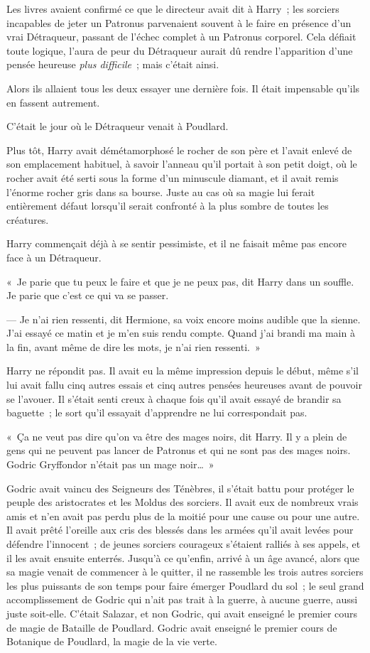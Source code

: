Les livres avaient confirmé ce que le directeur avait dit à Harry~; les sorciers incapables de jeter un Patronus parvenaient souvent à le faire en présence d'un vrai Détraqueur, passant de l'échec complet à un Patronus corporel. Cela défiait toute logique, l'aura de peur du Détraqueur aurait dû rendre l'apparition d'une pensée heureuse \emph{plus difficile}~; mais c'était ainsi.

Alors ils allaient tous les deux essayer une dernière fois. Il était impensable qu'ils en fassent autrement.

C'était le jour où le Détraqueur venait à Poudlard.

Plus tôt, Harry avait démétamorphosé le rocher de son père et l'avait enlevé de son emplacement habituel, à savoir l'anneau qu'il portait à son petit doigt, où le rocher avait été serti sous la forme d'un minuscule diamant, et il avait remis l'énorme rocher gris dans sa bourse. Juste au cas où sa magie lui ferait entièrement défaut lorsqu'il serait confronté à la plus sombre de toutes les créatures.

Harry commençait déjà à se sentir pessimiste, et il ne faisait même pas encore face à un Détraqueur.

«~Je parie que tu peux le faire et que je ne peux pas, dit Harry dans un souffle. Je parie que c'est ce qui va se passer.

--- Je n'ai rien ressenti, dit Hermione, sa voix encore moins audible que la sienne. J'ai essayé ce matin et je m'en suis rendu compte. Quand j'ai brandi ma main à la fin, avant même de dire les mots, je n'ai rien ressenti.~»

Harry ne répondit pas. Il avait eu la même impression depuis le début, même s'il lui avait fallu cinq autres essais et cinq autres pensées heureuses avant de pouvoir se l'avouer. Il s'était senti creux à chaque fois qu'il avait essayé de brandir sa baguette~; le sort qu'il essayait d'apprendre ne lui correspondait pas.

«~Ça ne veut pas dire qu'on va être des mages noirs, dit Harry. Il y a plein de gens qui ne peuvent pas lancer de Patronus et qui ne sont pas des mages noirs. Godric Gryffondor n'était pas un mage noir…~»

Godric avait vaincu des Seigneurs des Ténèbres, il s'était battu pour protéger le peuple des aristocrates et les Moldus des sorciers. Il avait eux de nombreux vrais amis et n'en avait pas perdu plus de la moitié pour une cause ou pour une autre. Il avait prêté l'oreille aux cris des blessés dans les armées qu'il avait levées pour défendre l'innocent~; de jeunes sorciers courageux s'étaient ralliés à ses appels, et il les avait ensuite enterrés. Jusqu'à ce qu'enfin, arrivé à un âge avancé, alors que sa magie venait de commencer à le quitter, il ne rassemble les trois autres sorciers les plus puissants de son temps pour faire émerger Poudlard du sol~; le seul grand accomplissement de Godric qui n'ait pas trait à la guerre, à aucune guerre, aussi juste soit-elle. C'était Salazar, et non Godric, qui avait enseigné le premier cours de magie de Bataille de Poudlard. Godric avait enseigné le premier cours de Botanique de Poudlard, la magie de la vie verte.

